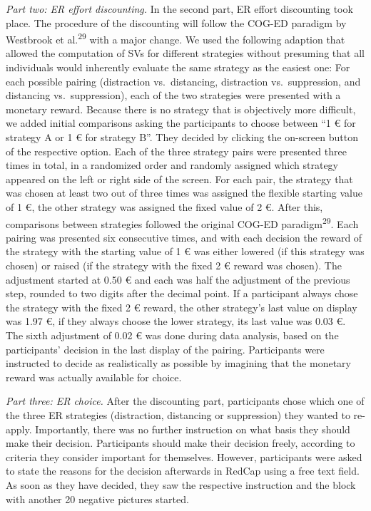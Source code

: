 \documentclass[
  man,floatsintext]{apa6}
\begin{document}
\emph{Part two: ER effort discounting.} In the second part, ER effort discounting took place.
The procedure of the discounting will follow the COG-ED paradigm by Westbrook et al.\textsuperscript{29} with a major change.
We used the following adaption that allowed the computation of SVs for different strategies without presuming that all individuals would inherently evaluate the same strategy as the easiest one: For each possible pairing (distraction vs.~distancing, distraction vs.~suppression, and distancing vs.~suppression), each of the two strategies were presented with a monetary reward.
Because there is no strategy that is objectively more difficult, we added initial comparisons asking the participants to choose between ``1 € for strategy A or 1 € for strategy B''.
They decided by clicking the on-screen button of the respective option.
Each of the three strategy pairs were presented three times in total, in a randomized order and randomly assigned which strategy appeared on the left or right side of the screen.
For each pair, the strategy that was chosen at least two out of three times was assigned the flexible starting value of 1 €, the other strategy was assigned the fixed value of 2 €.
After this, comparisons between strategies followed the original COG-ED paradigm\textsuperscript{29}.
Each pairing was presented six consecutive times, and with each decision the reward of the strategy with the starting value of 1 € was either lowered (if this strategy was chosen) or raised (if the strategy with the fixed 2 € reward was chosen).
The adjustment started at 0.50 € and each was half the adjustment of the previous step, rounded to two digits after the decimal point.
If a participant always chose the strategy with the fixed 2 € reward, the other strategy's last value on display was 1.97 €, if they always choose the lower strategy, its last value was 0.03 €.
The sixth adjustment of 0.02 € was done during data analysis, based on the participants' decision in the last display of the pairing.
Participants were instructed to decide as realistically as possible by imagining that the monetary reward was actually available for choice.

\emph{Part three: ER choice.} After the discounting part, participants chose which one of the three ER strategies (distraction, distancing or suppression) they wanted to re-apply.
Importantly, there was no further instruction on what basis they should make their decision.
Participants should make their decision freely, according to criteria they consider important for themselves.
However, participants were asked to state the reasons for the decision afterwards in RedCap using a free text field.
As soon as they have decided, they saw the respective instruction and the block with another 20 negative pictures started.
\end{document}
